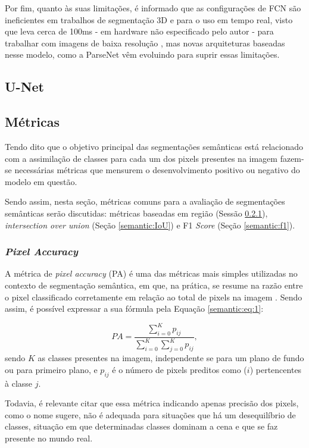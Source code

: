 Por fim, quanto às suas limitações, é informado que as configurações de FCN são ineficientes em trabalhos de segmentação 3D e para o uso em tempo real, visto que leva cerca de 100ms - em hardware não especificado pelo autor - para trabalhar com imagens de baixa resolução \cite{Minaee2021}, mas novas arquiteturas baseadas nesse modelo, como a ParseNet \cite{Liu2015} vêm evoluindo para suprir essas limitações.

\subsection{U-Net}
\label{semantic:unet}


\subsection{Métricas}
\label{semantic:metrics}
Tendo dito que o objetivo principal das segmentações semânticas está relacionado com a assimilação de classes para cada um dos pixels presentes na imagem \cite{Csurka2013} fazem-se necessárias métricas que mensurem o desenvolvimento positivo ou negativo do modelo em questão.

Sendo assim, nesta seção, métricas comuns para a avaliação de segmentações semânticas serão discutidas: métricas baseadas em região (Sessão \ref{semantic:pa}), \textit{intersection over union} (Seção \ref{semantic:IoU}) e F1 \textit{Score} (Seção \ref{semantic:f1}).


\subsubsection{\textit{Pixel Accuracy}}
\label{semantic:pa}
A métrica de \textit{pixel accuracy} (PA) é uma das métricas mais simples utilizadas no contexto de segmentação semântica, em que, na prática, se resume na razão entre o pixel classificado corretamente em relação ao total de pixels na imagem \cite{Minaee2021}. Sendo assim, é possível expressar a sua fórmula pela Equação \ref{semantic:eq:1}:

\begin{equation}
    \label{semantic:eq:1}
    PA = \frac{\sum_{i=0}^{K} p_{ij}}{\sum_{i=0}^{K} \sum_{j=0}^{K} p_{ij}},
\end{equation}
sendo $K$ as classes presentes na imagem, independente se para um plano de fundo ou para primeiro plano, e $p_{ij}$ é o número de pixels preditos como ($i$) pertencentes à classe $j$.

Todavia, é relevante citar que essa métrica indicando apenas precisão dos pixels, como o nome sugere, não é adequada para situações que há um desequilíbrio de classes, situação em que determinadas classes dominam a cena e que se faz presente no mundo real.


